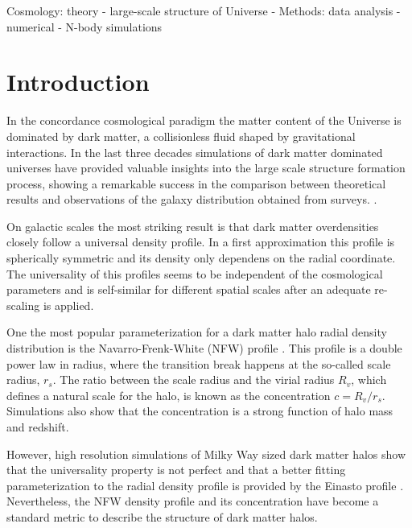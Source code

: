 \documentclass[a4,useAMS,usenatbib,usegraphicx]{mn2e}
\begin{document}
\begin{keywords}
Cosmology: theory - large-scale structure of Universe -
Methods: data analysis - numerical - N-body simulations
\end{keywords}


\section{Introduction}
\label{sec:introduction}
In the concordance cosmological paradigm the matter content of the
Universe is dominated by dark matter, a collisionless fluid shaped by
gravitational interactions.
In the last three decades simulations of dark matter dominated
universes have provided valuable insights into the large scale
structure formation process, showing a remarkable success in the
comparison between theoretical results and observations of the
galaxy distribution obtained from surveys.
\citep{Springel2005,2011ApJ...740..102K}.


On galactic scales the most striking result is that dark matter
overdensities closely follow a universal density profile. 
In a first approximation this profile is spherically symmetric and its
density only dependens on the radial coordinate.
The universality of this profiles seems to be independent of the
cosmological parameters and is self-similar for different spatial
scales after an adequate re-scaling is applied. 
\citep{NFW,Taylor2001}

One the most popular parameterization for a dark matter halo radial
density distribution is the Navarro-Frenk-White (NFW) profile
\citep{NFW}.
This profile is a double power law in radius, where the transition break
happens at the so-called scale radius, $r_s$.
The ratio between the scale radius and the virial radius $R_v$, which
defines a natural scale for the halo, is known as the concentration
$c=R_v/r_s$. 
Simulations also show that the concentration is a strong function of
halo mass and redshift. 

However, high resolution simulations of Milky Way sized dark matter halos
\citep{Navarro2010} show that the universality property is not
perfect and that a better fitting parameterization to the radial
density profile is provided by the Einasto profile
\citep{Einasto1965}.
Nevertheless, the NFW density profile and its concentration have
become a standard metric to describe the structure of dark matter
halos. 
\end{document}
